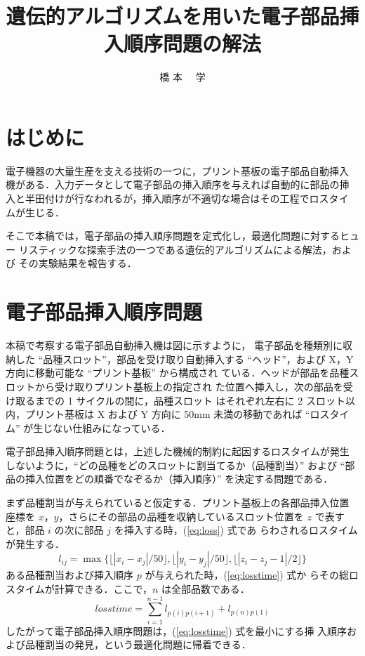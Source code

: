 \documentclass[a4j]{jarticle}
\title{遺伝的アルゴリズムを用いた電子部品挿入順序問題の解法}
\author{橋 本 ~~学}
\begin{document}
\begin{Abstract}
 
 \section{はじめに}
 電子機器の大量生産を支える技術の一つに，プリント基板の電子部品自動挿入
 機がある．入力データとして電子部品の挿入順序を与えれば自動的に部品の挿
 入と半田付けが行なわれるが，挿入順序が不適切な場合はその工程でロスタイ
 ムが生じる．
 
 そこで本稿では，電子部品の挿入順序問題を定式化し，最適化問題に対するヒュー
 リスティックな探索手法の一つである遺伝的アルゴリズムによる解法，および
 その実験結果を報告する．
 
 \section{電子部品挿入順序問題}
 本稿で考察する電子部品自動挿入機は図に示すように，
 電子部品を種類別に収納した ``品種スロット''，部品を受け取り自動挿入する %
 ``ヘッド''，および X，Y 方向に移動可能な ``プリント基板'' から構成され
 ている．ヘッドが部品を品種スロットから受け取りプリント基板上の指定され
 た位置へ挿入し，次の部品を受け取るまでの 1 サイクルの間に，品種スロット
 はそれぞれ左右に 2 スロット以内，プリント基板は X および Y 方向に 50mm %
 未満の移動であれば ``ロスタイム'' が生じない仕組みになっている．

 
 電子部品挿入順序問題とは，上述した機械的制約に起因するロスタイムが発生
 しないように，``どの品種をどのスロットに割当てるか（品種割当）'' および %
 ``部品の挿入位置をどの順番でなぞるか（挿入順序）'' を決定する問題である．

 まず品種割当が与えられていると仮定する．プリント基板上の各部品挿入位置
 座標を $x$，$y$，さらにその部品の品種を収納しているスロット位置を $z$ %
 で表すと，部品 $i$ の次に部品 $j$ を挿入する時，(\ref{eq:loss}) 式であ
 らわされるロスタイムが発生する．
 \begin{equation}
  l_{ij} = \max\{
   \lfloor |x_i - x_j| / 50 \rfloor,
   \lfloor |y_i - y_j| / 50 \rfloor,
   \lfloor |z_i - z_j - 1| / 2 \rfloor
   \}
   \label{eq:loss}
 \end{equation}
 ある品種割当および挿入順序 $p$ が与えられた時，(\ref{eq:losstime}) 式か
 らその総ロスタイムが計算できる．ここで，$n$ は全部品数である．
 \begin{equation}
  losstime = \sum_{i = 1}^{n - 1}l_{p(i) p(i + 1)} + l_{p(n) p(1)}
   \label{eq:losstime}
 \end{equation}
 したがって電子部品挿入順序問題は，(\ref{eq:losstime}) 式を最小にする挿
 入順序および品種割当の発見，という最適化問題に帰着できる．


\end{Abstract}
\end{document}
